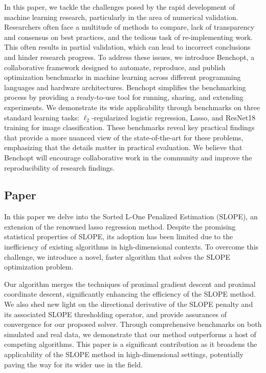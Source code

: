 \documentclass{book}
\begin{document}
In this paper, we tackle the challenges posed by the rapid development of machine learning research, particularly in the area of numerical validation. Researchers often face a multitude of methods to compare, lack of transparency and consensus on best practices, and the tedious task of re-implementing work. This often results in partial validation, which can lead to incorrect conclusions and hinder research progress. To address these issues, we introduce Benchopt, a collaborative framework designed to automate, reproduce, and publish optimization benchmarks in machine learning across different programming languages and hardware architectures. Benchopt simplifies the benchmarking process by providing a ready-to-use tool for running, sharing, and extending experiments. We demonstrate its wide applicability through benchmarks on three standard learning tasks: $\ell_2$-regularized logistic regression, Lasso, and ResNet18 training for image classification. These benchmarks reveal key practical findings that provide a more nuanced view of the state-of-the-art for these problems, emphasizing that the details matter in practical evaluation. We believe that Benchopt will encourage collaborative work in the community and improve the reproducibility of research findings.

\subsection{Paper \V}

In this paper we delve into the Sorted L-One Penalized Estimation (SLOPE), an extension of the renowned lasso regression method. Despite the promising statistical properties of SLOPE, its adoption has been limited due to the inefficiency of existing algorithms in high-dimensional contexts. To overcome this challenge, we introduce a novel, faster algorithm that solves the SLOPE optimization problem.

Our algorithm merges the techniques of proximal gradient descent and proximal coordinate descent, significantly enhancing the efficiency of the SLOPE method. We also shed new light on the directional derivative of the SLOPE penalty and its associated SLOPE thresholding operator, and provide assurances of convergence for our proposed solver. Through comprehensive benchmarks on both simulated and real data, we demonstrate that our method outperforms a host of competing algorithms. This paper is a significant contribution as it broadens the applicability of the SLOPE method in high-dimensional settings, potentially paving the way for its wider use in the field.
\end{document}
